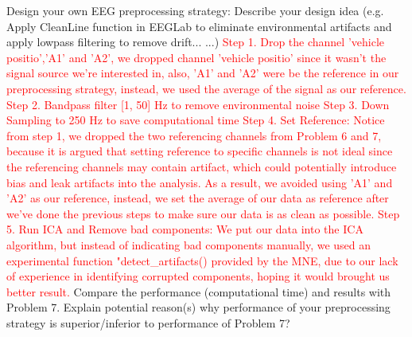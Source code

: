 \documentclass[a4 paper]{article}
\begin{document}
\begin{tcolorbox}[colback=RubineRed!5!white,colframe=RubineRed!75!black]
Design your own EEG preprocessing strategy:
 Describe your design idea (e.g. Apply CleanLine function in EEGLab to eliminate environmental artifacts and apply lowpass filtering to remove drift... ...)
\textcolor{red}{\newline Step 1. Drop the channel 'vehicle positio','A1' and 'A2', we dropped channel 'vehicle positio' since it wasn’t the signal source we're interested in, also, 'A1' and 'A2' were be the reference in our preprocessing strategy, instead, we used the average of the signal as our reference.
\newline Step 2. Bandpass filter [1, 50] Hz to remove environmental noise
\newline Step 3. Down Sampling to 250 Hz to save computational time
\newline Step 4. Set Reference: Notice from step 1, we dropped the two referencing channels from Problem 6 and 7, because it is argued that setting reference to specific channels is not ideal since the referencing channels may contain artifact, which could potentially introduce bias and leak artifacts into the analysis.
As a result, we avoided using 'A1' and 'A2' as our reference, instead, we set the average of our data as reference after we've done the previous steps to make sure our data is as clean as possible.
\newline Step 5. Run ICA and Remove bad components: We put our data into the ICA algorithm, but instead of indicating bad components manually, we used an experimental function "detect\_artifacts() provided by the MNE, due to our lack of experience in identifying corrupted components, hoping it would brought us better result.
}
 Compare the performance (computational time) and results with Problem 7.
 Explain potential reason(s) why performance of your preprocessing strategy is superior/inferior to performance of Problem 7? 
\end{tcolorbox}
\end{document}

